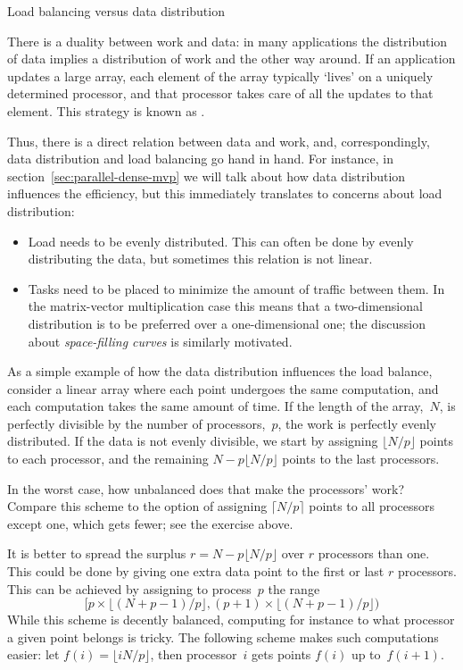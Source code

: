  {Load balancing versus data distribution}
\label{sec:load-vs-data}

There is a duality between work and data: in many applications
the distribution of data implies a distribution of work and
the other way around. If an application updates a large array,
each element of the array typically `lives' on a uniquely determined
processor, and that processor takes care of all the updates to that
element. This strategy is known as .

Thus, there is a direct relation between data and work,
and, correspondingly, data distribution and load balancing go hand in hand.
For instance, in section~\ref{sec:parallel-dense-mvp} we will talk about
how data distribution influences the efficiency, but this immediately translates
to concerns about load distribution:
\begin{itemize}
\item Load needs to be evenly distributed. This can often be done by
  evenly distributing the data, but sometimes this relation is not linear.
\item Tasks need to be placed to minimize the amount of traffic between them.
  In the matrix-vector multiplication case this means that a two-dimensional distribution
  is to be preferred over a one-dimensional one; the discussion about
  \emph{space-filling curves} is similarly motivated.
\end{itemize}

As a simple example of how the data distribution influences the load
balance, consider a linear array where each point undergoes the same
computation, and each computation takes the same amount of time.
If the length of the array,~$N$, is perfectly divisible by the number
of processors,~$p$, the work is perfectly evenly distributed.
If the data is not evenly divisible, we start by assigning $\lfloor N/p\rfloor$
points to each processor, and the remaining $N-p\lfloor N/p\rfloor$
points to the last processors.

\begin{exercise}
In the worst case, how unbalanced does that make the processors' work?
Compare this scheme to the option of assigning $\lceil N/p\rceil$
points to all processors except one, which gets fewer; see the exercise above.
\end{exercise}

It is better to spread the surplus $r=N-p\lfloor N/p\rfloor$
over $r$ processors than one. This could be done by giving one extra
data point to the first or last $r$ processors. This can be achieved
by assigning to process~$p$ the range
\[ \bigl[ p\times \lfloor (N+p-1)/p \rfloor, (p+1)\times \lfloor
  (N+p-1)/p \rfloor \bigr)
\]
While this scheme
is decently balanced, computing for instance to what processor
a given point belongs is tricky. The following scheme makes
such computations easier: let $f(i)=\lfloor iN/p\rfloor$, then processor~$i$
gets points $f(i)$ up to~$f(i+1)$.


